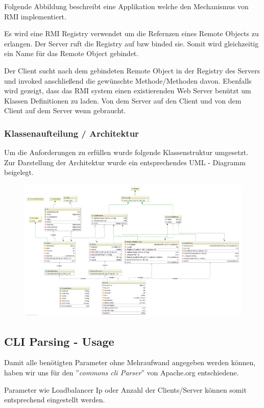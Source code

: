 Folgende Abbildung beschreibt eine Applikation welche den Mechanismus von RMI implementiert.

Es wird eine RMI Registry verwendet um die Refernzen eines Remote Objects zu erlangen. Der Server ruft die Registry auf bzw binded sie. Somit wird gleichzeitig ein Name für das Remote Object gebindet.

Der Client sucht nach dem gebindeten Remote Object in der Registry des Servers und invoked anschließend die gewünschte Methode/Methoden davon.
Ebenfalls wird gezeigt, dass das RMI system einen existierenden Web Server benützt um Klassen Definitionen zu laden. Von dem Server auf den Client und von dem Client auf dem Server wenn gebraucht. 

\subsubsection{Klassenaufteilung / Architektur}
Um die Anforderungen zu erfüllen wurde folgende Klassenstruktur umgesetzt. Zur Darstellung der Architektur wurde ein entsprechendes UML - Diagramm beigelegt.
\begin{figure}[!h]
	\centering
	\includegraphics[width=1\linewidth]{images/diagram}
	\caption{}
	\label{fig:diagram}
	
\end{figure}

\subsection{CLI Parsing - Usage}
Damit alle benötigten Parameter ohne Mehraufwand angegeben werden können, haben wir uns für den ''\textit{commons cli Parser}'' von Apache.org entschiedene.

Parameter wie Loadbalancer Ip oder Anzahl der Clients/Server können somit entsprechend eingestellt werden.


